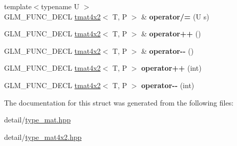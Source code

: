 \begin{DoxyCompactItemize}
\item 
\hypertarget{structglm_1_1tmat4x2_a249db7437c8109b32811b84b543d97a5}{{\footnotesize template$<$typename U $>$ }\\G\-L\-M\-\_\-\-F\-U\-N\-C\-\_\-\-D\-E\-C\-L \hyperlink{structglm_1_1tmat4x2}{tmat4x2}$<$ T, P $>$ \& {\bfseries operator/=} (U s)}\label{structglm_1_1tmat4x2_a249db7437c8109b32811b84b543d97a5}

\item 
\hypertarget{structglm_1_1tmat4x2_a90277f6f6f70fee24ad93aeac6ed64fb}{G\-L\-M\-\_\-\-F\-U\-N\-C\-\_\-\-D\-E\-C\-L \hyperlink{structglm_1_1tmat4x2}{tmat4x2}$<$ T, P $>$ \& {\bfseries operator++} ()}\label{structglm_1_1tmat4x2_a90277f6f6f70fee24ad93aeac6ed64fb}

\item 
\hypertarget{structglm_1_1tmat4x2_aa15f52860e0d0c782b302e6bb116acf3}{G\-L\-M\-\_\-\-F\-U\-N\-C\-\_\-\-D\-E\-C\-L \hyperlink{structglm_1_1tmat4x2}{tmat4x2}$<$ T, P $>$ \& {\bfseries operator-\/-\/} ()}\label{structglm_1_1tmat4x2_aa15f52860e0d0c782b302e6bb116acf3}

\item 
\hypertarget{structglm_1_1tmat4x2_a6a14ceacc882586f97403b6d12126de2}{G\-L\-M\-\_\-\-F\-U\-N\-C\-\_\-\-D\-E\-C\-L \hyperlink{structglm_1_1tmat4x2}{tmat4x2}$<$ T, P $>$ {\bfseries operator++} (int)}\label{structglm_1_1tmat4x2_a6a14ceacc882586f97403b6d12126de2}

\item 
\hypertarget{structglm_1_1tmat4x2_a743f8f7b8063acf0cabf87dc81afbd7f}{G\-L\-M\-\_\-\-F\-U\-N\-C\-\_\-\-D\-E\-C\-L \hyperlink{structglm_1_1tmat4x2}{tmat4x2}$<$ T, P $>$ {\bfseries operator-\/-\/} (int)}\label{structglm_1_1tmat4x2_a743f8f7b8063acf0cabf87dc81afbd7f}

\end{DoxyCompactItemize}


The documentation for this struct was generated from the following files\-:\begin{DoxyCompactItemize}
\item 
detail/\hyperlink{type__mat_8hpp}{type\-\_\-mat.\-hpp}\item 
detail/\hyperlink{type__mat4x2_8hpp}{type\-\_\-mat4x2.\-hpp}\end{DoxyCompactItemize}

